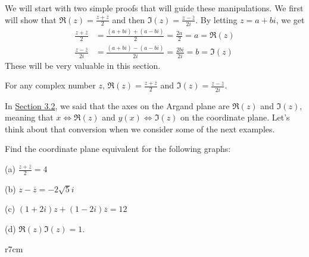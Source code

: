 \documentclass[lang=en,11pt]{elegantbook}
\begin{document}
We will start with two simple proofs that will guide these manipulations.  We first will show that $\displaystyle \Re(z)=\frac{z+\overline{z}}{2}$ and then $\displaystyle \Im(z)=\frac{z-\overline{z}}{2i}$.  By letting $z=a+bi$, we get \begin{align*}
    \frac{z+\overline{z}}{2}&=\frac{\left(a+bi\right)+\left(a-bi\right)}{2}=\frac{2a}{2}=a=\Re(z) \\
    \frac{z-\overline{z}}{2i}&=\frac{\left(a+bi\right)-\left(a-bi\right)}{2i}=\frac{2bi}{2i}=b=\Im(z)
\end{align*}
These will be very valuable in this section.  \begin{note}
For any complex number $z$, $\displaystyle \Re(z)=\frac{z+\overline{z}}{2}$ and $\displaystyle \Im(z)=\frac{z-\overline{z}}{2i}$.
\end{note}
\noindent In \hyperlink{section.3.2}{Section 3.2}, we said that the axes on the Argand plane are $\Re(z)$ and $\Im(z)$, meaning that $x \Longleftrightarrow \Re(z)$ and $y(x) \Longleftrightarrow \Im(z)$ on the coordinate plane.  Let's think about that conversion when we consider some of the next examples.
\begin{example}
Find the coordinate plane equivalent for the following graphs:

(a) $\displaystyle \frac{z+\overline{z}}{2}=4$

(b) $z-\overline{z}=-2\sqrt{5}i$

(c) $\left(1+2i\right)z+\left(1-2i\right)\overline{z}=12$

(d) $\Re(z)\Im(z)=1$.

\end{example}

\begin{wrapfigure}{r}{7cm}
    \centering
{}
\end{wrapfigure}
\end{document}
